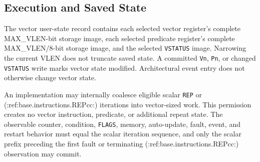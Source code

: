 \subsection{Execution and Saved State}

The vector user-state record contains each selected vector register's complete
MAX\_VLEN-bit storage image, each selected predicate register's complete
MAX\_VLEN/8-bit storage image, and the selected \texttt{VSTATUS} image.
Narrowing the current VLEN does not truncate saved state. A
committed \texttt{Vn}, \texttt{Pn}, or changed \texttt{VSTATUS} write marks
vector state modified. Architectural event entry does not otherwise change
vector state.

An implementation may internally coalesce eligible scalar \texttt{REP} or
(:ref:base.instructions.REPcc:) iterations into vector-sized work.  This permission creates no
vector instruction, predicate, or additional repeat state.  The observable
counter, condition, \texttt{FLAGS}, memory, auto-update, fault, event, and
restart behavior must equal the scalar iteration sequence, and only the
scalar prefix preceding the first fault or terminating (:ref:base.instructions.REPcc:)
observation may commit.
